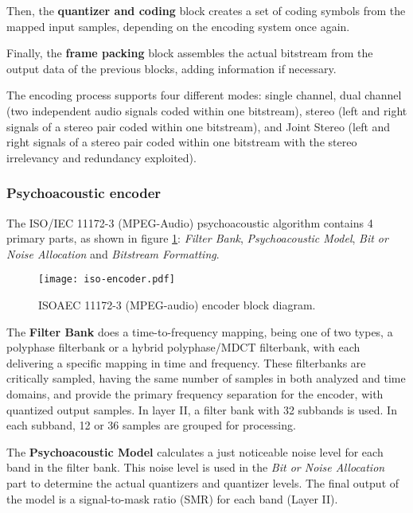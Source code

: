 Then, the \textbf{quantizer and coding} block creates a set of coding symbols from the mapped input samples, depending on the encoding system once again. 

Finally, the \textbf{frame packing} block assembles the actual bitstream from the output data of the previous blocks, adding information if necessary.

The encoding process supports four different modes: single channel, dual channel (two independent audio signals coded within one bitstream), stereo (left and right signals of a stereo pair coded within one bitstream), and Joint Stereo (left and right signals of a stereo pair coded within one bitstream with the stereo irrelevancy and redundancy exploited).

\subsubsection{Psychoacoustic encoder}

The ISO/IEC 11172-3 (MPEG-Audio) psychoacoustic algorithm contains 4 primary parts, as shown in figure \ref{fig:algorithm}: \textit{Filter Bank}, \textit{Psychoacoustic Model}, \textit{Bit or Noise Allocation} and \textit{Bitstream Formatting}.

\begin{figure}[H]
\centerline{\texttt{[image: iso-encoder.pdf]}}
\caption{ISOAEC 11172-3 (MPEG-audio) encoder block diagram.}
\label{fig:algorithm}
\end{figure}

The \textbf{Filter Bank} does a time-to-frequency mapping, being one of two types, a polyphase filterbank or a hybrid polyphase/MDCT filterbank, with each delivering a specific mapping in time and frequency.
These filterbanks are critically sampled, having the same number of samples in both analyzed and time domains, and provide the primary frequency separation for the encoder, with quantized output samples. 
In layer II, a filter bank with 32 subbands is used. In each subband, 12 or 36 samples are grouped for processing.

The \textbf{Psychoacoustic Model} calculates a just noticeable noise level for each band in the filter bank. This noise level is used in the \textit{Bit or Noise Allocation} part to determine the actual quantizers and quantizer levels. 
The final output of the model is a signal-to-mask ratio (SMR) for each band (Layer II).

